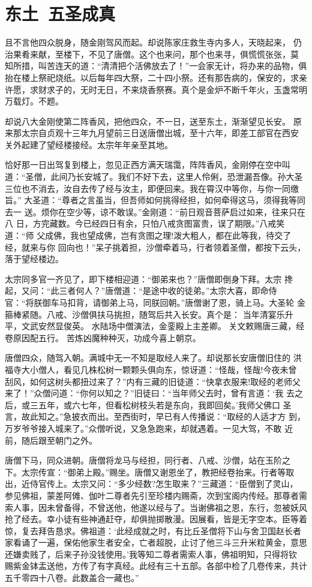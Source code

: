 \chapter{东土~五圣成真}

且不言他四众脱身，随金刚驾风而起。却说陈家庄救生寺内多人，天晓起来，
仍治果肴来献，至楼下，不见了唐僧。这个也来问，那个也来寻，俱慌慌张张，莫
知所措，叫苦连天的道：“清清把个活佛放去了！”一会家无计，将办来的品物，俱
抬在楼上祭祀烧纸。以后每年四大祭，二十四小祭。还有那告病的，保安的，求亲
许愿，求财求子的，无时无日，不来烧香祭赛。真个是金炉不断千年火，玉盏常明
万载灯。不题。

却说八大金刚使第二阵香风，把他四众，不一日，送至东土，渐渐望见长安。
原来那太宗自贞观十三年九月望前三日送唐僧出城，至十六年，即差工部官在西安
关外起建了望经楼接经。太宗年年亲至其地。

恰好那一日出驾复到楼上，忽见正西方满天瑞霭，阵阵香风，金刚停在空中叫
道：“圣僧，此间乃长安城了。我们不好下去，这里人伶俐，恐泄漏吾像。孙大圣
三位也不消去，汝自去传了经与汝主，即便回来。我在霄汉中等你，与你一同缴旨。”
大圣道：“尊者之言虽当，但吾师如何挑得经担，如何牵得这马，须得我等同去一
送。烦你在空少等，谅不敢误。”金刚道：“前日观音菩萨启过如来，往来只在八
日，方完藏数。今已经四日有余，只怕八戒贪图富贵，误了期限。”八戒笑道：“师
父成佛，我也望成佛，岂有贪图之理!泼大粗人，都在此等我，待交了经，就来与你
回向也！”呆子挑着担，沙僧牵着马，行者领着圣僧，都按下云头，落于望经楼边。

太宗同多官一齐见了，即下楼相迎道：“御弟来也？”唐僧即倒身下拜。太宗
搀起，又问：“此三者何人？”唐僧道：“是途中收的徒弟。”太宗大喜，即命侍
官：“将朕御车马扣背，请御弟上马，同朕回朝。”唐僧谢了恩，骑上马。大圣轮
金箍棒紧随。八戒、沙僧俱扶马挑担，随驾后共入长安。真个是：
当年清宴乐升平，文武安然显俊英。
水陆场中僧演法，金銮殿上主差卿。
关文敕赐唐三藏，经卷原因配五行。
苦炼凶魔种种灭，功成今喜上朝京。

唐僧四众，随驾入朝。满城中无一不知是取经人来了。却说那长安唐僧旧住的
洪福寺大小僧人，看见几株松树一颗颗头俱向东，惊讶道：“怪哉，怪哉!今夜未曾
刮风，如何这树头都扭过来了？”内有三藏的旧徒道：“快拿衣服来!取经的老师父
来了！”众僧问道：“你何以知之？”旧徒曰：“当年师父去时，曾有言道：‘我
去之后，或三五年，或六七年，但看松树枝头若是东向，我即回矣。’我师父佛口
圣言，故此知之。”急披衣而出。至西街时，早已有人传播说：“取经的人适才方
到，万岁爷爷接入城来了。”众僧听说，又急急跑来，却就遇着。一见大驾，不敢
近前，随后跟至朝门之外。

唐僧下马，同众进朝。唐僧将龙马与经担，同行者、八戒、沙僧，站在玉阶之
下。太宗传宣：“御弟上殿。”赐坐。唐僧又谢恩坐了，教把经卷抬来。行者等取
出，近侍官传上。太宗又问：“多少经数?怎生取来？”三藏道：“臣僧到了灵山，
参见佛祖，蒙差阿傩、伽叶二尊者先引至珍楼内赐斋，次到宝阁内传经。那尊者需
索人事，因未曾备得，不曾送他，他遂以经与了。当谢佛祖之恩，东行，忽被妖风
抢了经去。幸小徒有些神通赶夺，却俱抛掷散漫。因展看，皆是无字空本。臣等着
惊，复去拜告恳求。佛祖道：‘此经成就之时，有比丘圣僧将下山与舍卫国赵长者
家看诵了一遍，保佑他家生者安全，亡者超脱，止讨了他三斗三升米粒黄金，意思
还嫌卖贱了，后来子孙没钱使用。’我等知二尊者需索人事，佛祖明知，只得将钦
赐紫金钵盂送他，方传了有字真经。此经有三十五部。各部中检了几卷传来，共计
五千零四十八卷。此数盖合一藏也。”

